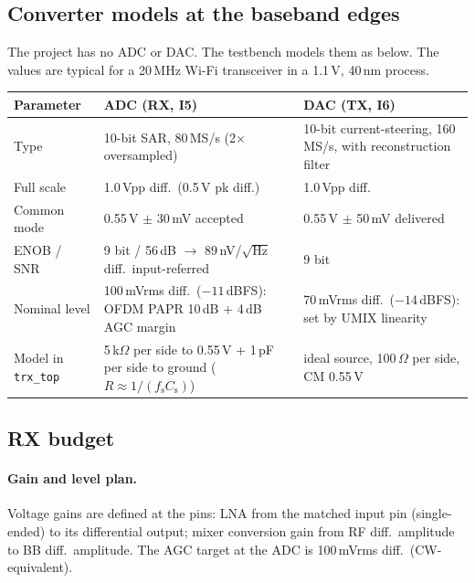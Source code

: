 
\subsection{Converter models at the baseband edges}\label{sec:integrator-converters}
The project has no ADC or DAC. The testbench models them as below. The values
are typical for a 20\,MHz Wi-Fi transceiver in a 1.1\,V, 40\,nm process.

\par\medskip\noindent\small
\begin{tabularx}{\textwidth}{@{}P{0.3\textwidth} L L@{}}
	\toprule
	\textbf{Parameter} & \textbf{ADC (RX, I5)} & \textbf{DAC (TX, I6)} \\
	\midrule
	Type & 10-bit SAR, 80\,MS/s (2$\times$ oversampled) & 10-bit current-steering, 160\,MS/s, with reconstruction filter \\
	Full scale & 1.0\,Vpp diff.\ (0.5\,V pk diff.) & 1.0\,Vpp diff. \\
	Common mode & 0.55\,V $\pm$ 30\,mV accepted & 0.55\,V $\pm$ 50\,mV delivered \\
	ENOB / SNR & 9 bit / 56\,dB $\to$ 89\,nV/$\sqrt{\mathrm{Hz}}$ diff.\ input-referred & 9 bit \\
	Nominal level & 100\,mVrms diff.\ ($-11$\,dBFS): OFDM PAPR 10\,dB + 4\,dB AGC margin & 70\,mVrms diff.\ ($-14$\,dBFS): set by UMIX linearity \\
	Model in \texttt{trx\_top} & 5\,k$\Omega$ per side to 0.55\,V + 1\,pF per side to ground ($R \approx 1/(f_\mathrm{s} C_\mathrm{s})$) & ideal source, 100\,$\Omega$ per side, CM 0.55\,V \\
	\bottomrule
\end{tabularx}\par\normalsize

\subsection{RX budget}\label{sec:integrator-budget}

\paragraph{Gain and level plan.}
Voltage gains are defined at the pins: LNA from the matched input pin (single-ended)
to its differential output; mixer conversion gain from RF diff.\ amplitude to BB diff.\
amplitude. The AGC target at the ADC is 100\,mVrms diff.\ (CW-equivalent).

